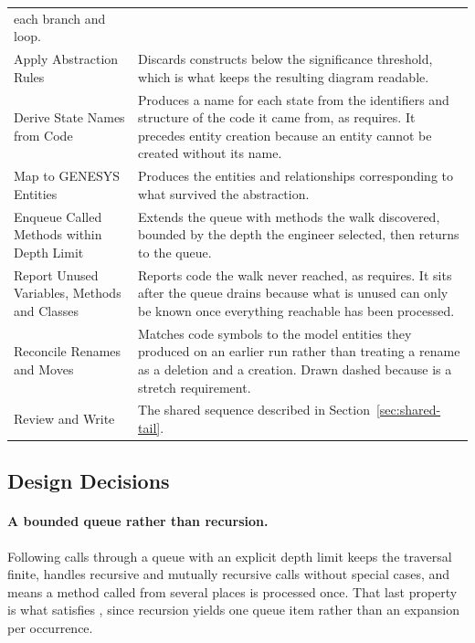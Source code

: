 \begin{longtable}{L{0.30\textwidth}L{0.62\textwidth}}
	each branch and loop. \\
	\addlinespace
	Apply Abstraction Rules & Discards constructs below the significance
	threshold, which is what keeps the resulting diagram readable. \\
	\addlinespace
	Derive State Names from Code & Produces a name for each state from the
	identifiers and structure of the code it came from, as  requires. It
	precedes entity creation because an entity cannot be created without its
	name. \\
	\addlinespace
	Map to GENESYS Entities & Produces the entities and relationships
	corresponding to what survived the abstraction. \\
	\addlinespace
	Enqueue Called Methods within Depth Limit & Extends the queue with methods the
	walk discovered, bounded by the depth the engineer selected, then returns to
	the queue. \\
	\addlinespace
	Report Unused Variables, Methods and Classes & Reports code the walk never
	reached, as  requires. It sits after the queue drains because what is
	unused can only be known once everything reachable has been processed. \\
	\addlinespace
	Reconcile Renames and Moves & Matches code symbols to the model entities they
	produced on an earlier run rather than treating a rename as a deletion and a
	creation. Drawn dashed because  is a stretch requirement. \\
	\addlinespace
	Review and Write & The shared sequence described in
	Section~\ref{sec:shared-tail}. \\
	\bottomrule
\end{longtable}

\subsection{Design Decisions}

\paragraph{A bounded queue rather than recursion.}
Following calls through a queue with an explicit depth limit keeps the traversal
finite, handles recursive and mutually recursive calls without special cases,
and means a method called from several places is processed once. That last
property is what satisfies , since recursion yields one queue item
rather than an expansion per occurrence.

